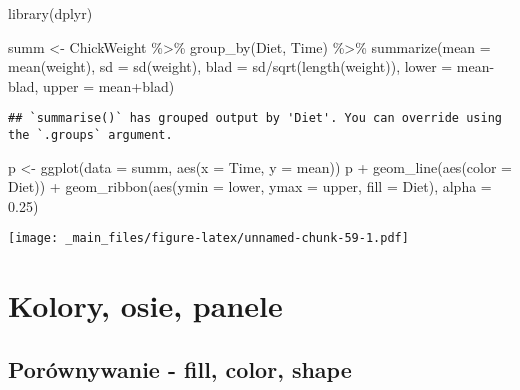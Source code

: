 \documentclass[
]{book}
\newenvironment{Shaded}{\begin{snugshade}}{\end{snugshade}}
\newcommand{\AttributeTok}[1]{\textcolor[rgb]{0.77,0.63,0.00}{#1}}
\newcommand{\FloatTok}[1]{\textcolor[rgb]{0.00,0.00,0.81}{#1}}
\newcommand{\FunctionTok}[1]{\textcolor[rgb]{0.00,0.00,0.00}{#1}}
\newcommand{\NormalTok}[1]{#1}
\newcommand{\OtherTok}[1]{\textcolor[rgb]{0.56,0.35,0.01}{#1}}
\newcommand{\SpecialCharTok}[1]{\textcolor[rgb]{0.00,0.00,0.00}{#1}}
\begin{document}
\begin{Shaded}
\begin{Highlighting}[]
\FunctionTok{library}\NormalTok{(dplyr)}

\NormalTok{summ }\OtherTok{\textless{}{-}}\NormalTok{ ChickWeight }\SpecialCharTok{\%\textgreater{}\%} \FunctionTok{group\_by}\NormalTok{(Diet, Time) }\SpecialCharTok{\%\textgreater{}\%} 
  \FunctionTok{summarize}\NormalTok{(}\AttributeTok{mean =} \FunctionTok{mean}\NormalTok{(weight), }
            \AttributeTok{sd =} \FunctionTok{sd}\NormalTok{(weight), }
            \AttributeTok{blad =}\NormalTok{ sd}\SpecialCharTok{/}\FunctionTok{sqrt}\NormalTok{(}\FunctionTok{length}\NormalTok{(weight)), }
            \AttributeTok{lower =}\NormalTok{ mean}\SpecialCharTok{{-}}\NormalTok{blad, }
            \AttributeTok{upper =}\NormalTok{ mean}\SpecialCharTok{+}\NormalTok{blad)}
\end{Highlighting}
\end{Shaded}

\begin{verbatim}
## `summarise()` has grouped output by 'Diet'. You can override using the `.groups` argument.
\end{verbatim}

\begin{Shaded}
\begin{Highlighting}[]
\NormalTok{p }\OtherTok{\textless{}{-}} \FunctionTok{ggplot}\NormalTok{(}\AttributeTok{data =}\NormalTok{ summ, }\FunctionTok{aes}\NormalTok{(}\AttributeTok{x =}\NormalTok{ Time, }\AttributeTok{y =}\NormalTok{ mean))}
\NormalTok{p }\SpecialCharTok{+} \FunctionTok{geom\_line}\NormalTok{(}\FunctionTok{aes}\NormalTok{(}\AttributeTok{color =}\NormalTok{ Diet)) }\SpecialCharTok{+} 
  \FunctionTok{geom\_ribbon}\NormalTok{(}\FunctionTok{aes}\NormalTok{(}\AttributeTok{ymin =}\NormalTok{ lower, }\AttributeTok{ymax =}\NormalTok{ upper, }\AttributeTok{fill =}\NormalTok{ Diet), }\AttributeTok{alpha =} \FloatTok{0.25}\NormalTok{)}
\end{Highlighting}
\end{Shaded}

\texttt{[image: \_main\_files/figure-latex/unnamed-chunk-59-1.pdf]}

\hypertarget{kolory-osie-panele}{%
\section{Kolory, osie, panele}\label{kolory-osie-panele}}

\hypertarget{poruxf3wnywanie---fill-color-shape}{%
\subsection{Porównywanie - fill, color, shape}\label{poruxf3wnywanie---fill-color-shape}}
\end{document}
